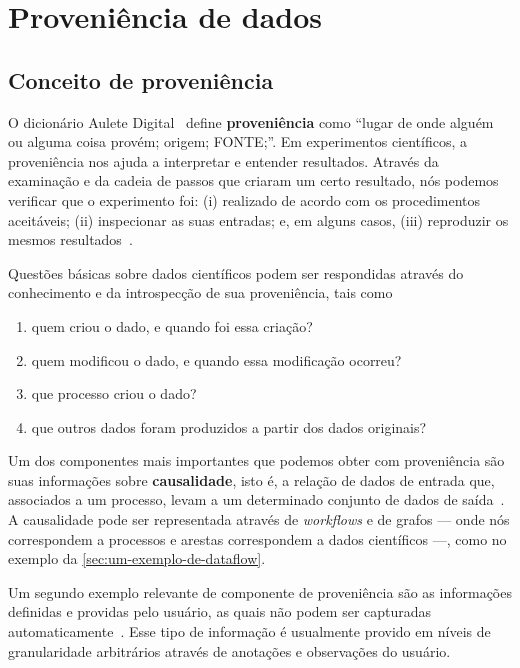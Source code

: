 \section{Proveniência de dados}

\subsection{Conceito de proveniência}  %

O dicionário Aulete Digital~\cite{auletedigitalonline} define \textbf{proveniência} como
``lugar de onde alguém ou alguma coisa provém; origem; FONTE;''. Em experimentos científicos, a proveniência nos ajuda a interpretar e entender resultados. Através da examinação e da cadeia de passos que criaram um certo resultado, nós podemos verificar que o experimento foi: (i) realizado de acordo com os procedimentos aceitáveis; (ii) inspecionar as suas entradas; e, em alguns casos, (iii) reproduzir os mesmos resultados~\cite{freire2008provenance}.

Questões básicas sobre dados científicos podem ser respondidas através do conhecimento e da introspecção de sua proveniência, tais como

\begin{enumerate}
    \item quem criou o dado, e quando foi essa criação?
    \item quem modificou o dado, e quando essa modificação ocorreu?
    \item que processo criou o dado?
    \item que outros dados foram produzidos a partir dos dados originais?
\end{enumerate}

Um dos componentes mais importantes que podemos obter com proveniência são suas informações sobre \textbf{causalidade}, isto é, a relação de dados de entrada que, associados a um processo, levam a um determinado conjunto de dados de saída~\cite{freire2008provenance}. A causalidade pode ser representada através de \textit{workflows} e de grafos --- onde nós correspondem a processos e arestas correspondem a dados científicos ---, como no exemplo da \autoref{sec:um-exemplo-de-dataflow}.

Um segundo exemplo relevante de componente de proveniência são as informações definidas e providas pelo usuário, as quais não podem ser capturadas automaticamente~\cite{freire2008provenance}. Esse tipo de informação é usualmente provido em níveis de granularidade arbitrários através de anotações e observações do usuário.

